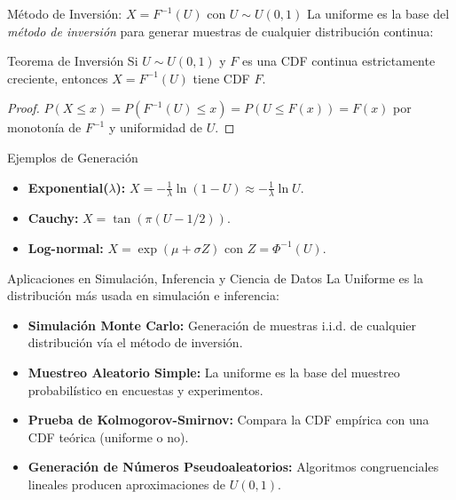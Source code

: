\documentclass[10pt, aspectratio=169]{beamer}
\begin{document}
\begin{frame}{Método de Inversión: $X = F^{-1}(U)$ con $U \sim U(0, 1)$}
  \footnotesize
  La uniforme es la base del \emph{método de inversión} para generar muestras de cualquier distribución continua: \pause

  \vspace{0.1cm}
  \begin{block}{Teorema de Inversión}
    Si $U \sim U(0, 1)$ y $F$ es una CDF continua estrictamente creciente, entonces $X = F^{-1}(U)$ tiene CDF $F$.
    \begin{proof}
      $P(X \le x) = P(F^{-1}(U) \le x) = P(U \le F(x)) = F(x)$ por monotonía de $F^{-1}$ y uniformidad de $U$.
    \end{proof}
  \end{block}

  \vspace{0.1cm}
  \pause
  \begin{alertblock}{Ejemplos de Generación}
    \begin{itemize}\itemsep=0.05cm
      \item \textbf{Exponential($\lambda$):} $X = -\frac{1}{\lambda}\ln(1-U) \approx -\frac{1}{\lambda}\ln U$.
      \item \textbf{Cauchy:} $X = \tan(\pi(U - 1/2))$.
      \item \textbf{Log-normal:} $X = \exp(\mu + \sigma Z)$ con $Z = \Phi^{-1}(U)$.
    \end{itemize}
  \end{alertblock}
\end{frame}

\begin{frame}{Aplicaciones en Simulación, Inferencia y Ciencia de Datos}
  \footnotesize
  La Uniforme es la distribución más usada en simulación e inferencia: \pause

  \vspace{0.15cm}
  \begin{itemize}\itemsep=0.12cm
    \item \textbf{Simulación Monte Carlo:} Generación de muestras i.i.d. de cualquier distribución vía el método de inversión. \pause
    \item \textbf{Muestreo Aleatorio Simple:} La uniforme es la base del muestreo probabilístico en encuestas y experimentos. \pause
    \item \textbf{Prueba de Kolmogorov-Smirnov:} Compara la CDF empírica con una CDF teórica (uniforme o no). \pause
    \item \textbf{Generación de Números Pseudoaleatorios:} Algoritmos congruenciales lineales producen aproximaciones de $U(0, 1)$.
  \end{itemize}
\end{frame}
\end{document}
